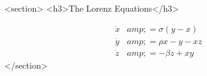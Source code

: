 				<section>
					<h3>The Lorenz Equations</h3>

					\[\begin{aligned}
					\dot{x} &amp; = \sigma(y-x) \\
					\dot{y} &amp; = \rho x - y - xz \\
					\dot{z} &amp; = -\beta z + xy
					\end{aligned} \]
				</section>

